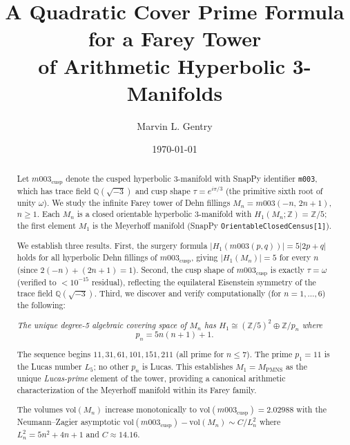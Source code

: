 \documentclass[11pt,a4paper]{article}
\theoremstyle{definition}
\newcommand{\ZZ}{\mathbb{Z}}
\newcommand{\QQ}{\mathbb{Q}}
\newcommand{\Zfive}{\ZZ/5}
\newcommand{\vol}{\mathrm{vol}}
\newcommand{\Mn}{M_n}
\newcommand{\Mcusp}{m003_{\mathrm{cusp}}}
\newcommand{\MPMNS}{M_{\mathrm{PMNS}}}
\begin{document}
\title{A Quadratic Cover Prime Formula for a Farey Tower\\
of Arithmetic Hyperbolic 3-Manifolds}

\author{Marvin L. Gentry}
\date{\today}

\maketitle

\begin{abstract}
Let $\Mcusp$ denote the cusped hyperbolic 3-manifold with
SnapPy identifier \texttt{m003}, which has trace field
$\QQ(\sqrt{-3})$ and cusp shape $\tau = e^{i\pi/3}$ (the primitive
sixth root of unity $\omega$).
We study the infinite Farey tower of Dehn fillings
$\Mn = m003(-n,\,2n+1)$, $n \geq 1$.
Each $\Mn$ is a closed orientable hyperbolic 3-manifold with
$H_1(\Mn;\ZZ) = \Zfive$; the first element $M_1$ is the Meyerhoff
manifold (SnapPy \texttt{OrientableClosedCensus[1]}).

We establish three results.
First, the surgery formula
$|H_1(m003(p,q))| = 5|2p+q|$
holds for all hyperbolic Dehn fillings of $\Mcusp$,
giving $|H_1(\Mn)| = 5$ for every $n$ (since $2(-n)+(2n+1) = 1$).
Second, the cusp shape of $\Mcusp$ is exactly $\tau = \omega$
(verified to $< 10^{-15}$ residual), reflecting the equilateral
Eisenstein symmetry of the trace field $\QQ(\sqrt{-3})$.
Third, we discover and verify computationally (for $n = 1,\ldots,6$)
the following:

\medskip
\emph{The unique degree-5 algebraic covering space of $\Mn$ has
$H_1 \cong (\Zfive)^2 \oplus \ZZ/p_n$ where
\[
  p_n = 5n(n+1)+1.
\]}

The sequence begins $11, 31, 61, 101, 151, 211$ (all prime for $n \leq 7$).
The prime $p_1 = 11$ is the Lucas number $L_5$; no other $p_n$ is Lucas.
This establishes $M_1 = \MPMNS$ as the unique \emph{Lucas-prime} element
of the tower, providing a canonical arithmetic characterization of the
Meyerhoff manifold within its Farey family.

The volumes $\vol(\Mn)$ increase monotonically to $\vol(\Mcusp) = 2.02988$
with the Neumann--Zagier asymptotic $\vol(\Mcusp) - \vol(\Mn) \sim C/L_n^2$
where $L_n^2 = 5n^2+4n+1$ and $C \approx 14.16$.
\end{abstract}

\tableofcontents
\end{document}
